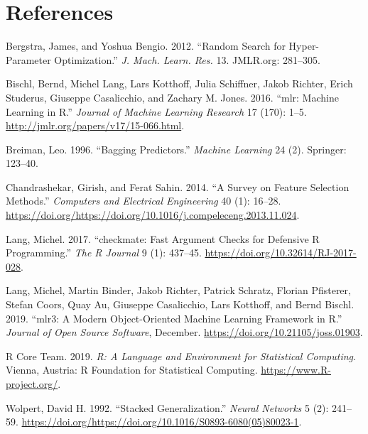 \documentclass[]{scrbook}
\begin{document}
\hypertarget{references}{%
\chapter*{References}\label{references}}

\hypertarget{refs}{}
\leavevmode\hypertarget{ref-bergstra2012}{}%
Bergstra, James, and Yoshua Bengio. 2012. ``Random Search for Hyper-Parameter Optimization.'' \emph{J. Mach. Learn. Res.} 13. JMLR.org: 281--305.

\leavevmode\hypertarget{ref-mlr}{}%
Bischl, Bernd, Michel Lang, Lars Kotthoff, Julia Schiffner, Jakob Richter, Erich Studerus, Giuseppe Casalicchio, and Zachary M. Jones. 2016. ``mlr: Machine Learning in R.'' \emph{Journal of Machine Learning Research} 17 (170): 1--5. \url{http://jmlr.org/papers/v17/15-066.html}.

\leavevmode\hypertarget{ref-Breiman1996}{}%
Breiman, Leo. 1996. ``Bagging Predictors.'' \emph{Machine Learning} 24 (2). Springer: 123--40.

\leavevmode\hypertarget{ref-chandrashekar2014}{}%
Chandrashekar, Girish, and Ferat Sahin. 2014. ``A Survey on Feature Selection Methods.'' \emph{Computers and Electrical Engineering} 40 (1): 16--28. \url{https://doi.org/https://doi.org/10.1016/j.compeleceng.2013.11.024}.

\leavevmode\hypertarget{ref-checkmate}{}%
Lang, Michel. 2017. ``checkmate: Fast Argument Checks for Defensive R Programming.'' \emph{The R Journal} 9 (1): 437--45. \url{https://doi.org/10.32614/RJ-2017-028}.

\leavevmode\hypertarget{ref-mlr3}{}%
Lang, Michel, Martin Binder, Jakob Richter, Patrick Schratz, Florian Pfisterer, Stefan Coors, Quay Au, Giuseppe Casalicchio, Lars Kotthoff, and Bernd Bischl. 2019. ``mlr3: A Modern Object-Oriented Machine Learning Framework in R.'' \emph{Journal of Open Source Software}, December. \url{https://doi.org/10.21105/joss.01903}.

\leavevmode\hypertarget{ref-R}{}%
R Core Team. 2019. \emph{R: A Language and Environment for Statistical Computing}. Vienna, Austria: R Foundation for Statistical Computing. \url{https://www.R-project.org/}.

\leavevmode\hypertarget{ref-Wolpert1992}{}%
Wolpert, David H. 1992. ``Stacked Generalization.'' \emph{Neural Networks} 5 (2): 241--59. \url{https://doi.org/https://doi.org/10.1016/S0893-6080(05)80023-1}.
\end{document}
